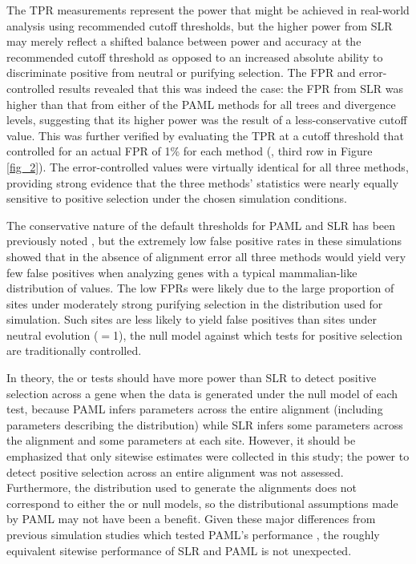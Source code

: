 The TPR measurements represent the power that might be achieved in
real-world analysis using recommended cutoff thresholds, but the
higher power from SLR may merely reflect a shifted balance between
power and accuracy at the recommended cutoff threshold as opposed to
an increased absolute ability to discriminate positive from neutral or
purifying selection. The FPR and error-controlled \tpr results
revealed that this was indeed the case: the FPR from SLR was higher
than that from either of the PAML methods for all trees and divergence
levels, suggesting that its higher power was the result of a
less-conservative cutoff value. This was further verified by
evaluating the TPR at a cutoff threshold that controlled for an actual
FPR of 1\% for each method (\tpr{}, third row in Figure
\ref{fig_2}). The error-controlled \tpr values were virtually
identical for all three methods, providing strong evidence that the
three methods' \sw statistics were nearly equally sensitive to
positive selection under the chosen simulation conditions.

The conservative nature of the default thresholds for PAML and SLR has
been previously noted
\citep{Anisimova2002,Yang2005Bayes,Massingham2005}, but the extremely
low false positive rates in these simulations showed that in the
absence of alignment error all three methods would yield very few
false positives when analyzing genes with a typical mammalian-like
distribution of \omg values. The low FPRs were likely due to the large
proportion of sites under moderately strong purifying selection in the
\omg distribution used for simulation. Such sites are less likely to
yield false positives than sites under neutral evolution (\omg$=$1), the
null model against which tests for positive selection are
traditionally controlled.


In theory, the \mtwo or \meight tests should have more power than SLR
to detect positive selection across a gene when the data is generated
under the null model of each test, because PAML infers parameters
across the entire alignment (including parameters describing the \omg
distribution) while SLR infers some parameters across the alignment
and some parameters at each site. However, it should be emphasized
that only sitewise estimates were collected in this study; the power
to detect positive selection across an entire alignment was not
assessed. Furthermore, the \omg distribution used to generate the
alignments does not correspond to either the \mtwo or \meight null
models, so the distributional assumptions made by PAML may not have
been a benefit. Given these major differences from previous simulation
studies which tested PAML's performance
\citep{Anisimova2002,Pond2005a}, the roughly equivalent sitewise
performance of SLR and PAML is not unexpected.

